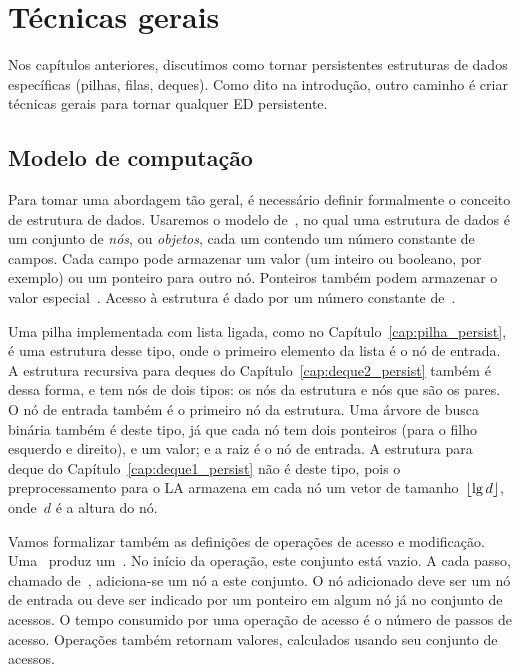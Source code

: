 \documentclass[../../main.tex]{subfiles}
\begin{document}
\chapter{Técnicas gerais} \label{cap:geral_persist}

Nos capítulos anteriores, discutimos como tornar persistentes estruturas de dados específicas (pilhas, filas, deques). Como dito na introdução, outro caminho é criar técnicas gerais para tornar qualquer ED persistente.


\section{Modelo de computação}

Para tomar uma abordagem tão geral, é necessário definir formalmente o conceito de estrutura de dados.  Usaremos o modelo de~, no qual uma estrutura de dados é um conjunto de \emph{nós}, ou \emph{objetos}, cada um contendo um número constante de campos. Cada campo pode armazenar um valor (um inteiro ou booleano, por exemplo) ou um ponteiro para outro nó. Ponteiros também podem armazenar o valor especial~.  Acesso à estrutura é dado por um número constante de~.


Uma pilha implementada com lista ligada, como no Capítulo~\ref{cap:pilha_persist}, é uma estrutura desse tipo, onde o primeiro elemento da lista é o nó de entrada. A estrutura recursiva para deques do Capítulo~\ref{cap:deque2_persist} também é dessa forma, e tem nós de dois tipos: os nós da estrutura e nós que são os pares. O nó de entrada também é o primeiro nó da estrutura.  Uma árvore de busca binária também é deste tipo, já que cada nó tem dois ponteiros (para o filho esquerdo e direito), e um valor; e a raiz é o nó de entrada.  A estrutura para deque do Capítulo~\ref{cap:deque1_persist} não é deste tipo, pois o preprocessamento para o LA armazena em cada nó um vetor de tamanho~$\lfloor\lg d\rfloor$, onde~$d$ é a altura do nó.

Vamos formalizar também as definições de operações de acesso e modificação. Uma~ produz um~. No início da operação, este conjunto está vazio.  A cada passo, chamado de~, adiciona-se um nó a este conjunto. O nó adicionado deve ser um nó de entrada ou deve ser indicado por um ponteiro em algum nó já no conjunto de acessos. O tempo consumido por uma operação de acesso é o número de passos de acesso. Operações também retornam valores, calculados usando seu conjunto de acessos.
\end{document}
